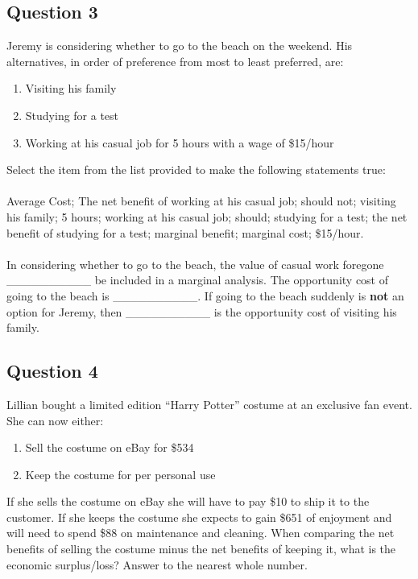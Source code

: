 \subsection{Question 3}
Jeremy is considering whether to go to the beach on the weekend. His alternatives, in order of preference from most to least preferred, are:
\begin{enumerate}
	\item Visiting his family
	\item Studying for a test
	\item Working at his casual job for 5 hours with a wage of \$15/hour
\end{enumerate}
Select the item from the list provided to make the following statements true:\\\\
Average Cost; The net benefit of working at his casual job; should not; visiting his family; 5 hours; working at his casual job; should; studying for a test; the net benefit of studying for a test; marginal benefit; marginal cost; \$15/hour.\\\\
In considering whether to go to the beach, the value of casual work foregone \_\_\_\_\_\_\_\_\_\_ be included in a marginal analysis. The opportunity cost of going to the beach is \_\_\_\_\_\_\_\_\_\_. If going to the beach suddenly is \textbf{not} an option for Jeremy, then \_\_\_\_\_\_\_\_\_\_ is the opportunity cost of visiting his family.

\subsection{Question 4}
Lillian bought a limited edition ``Harry Potter'' costume at an exclusive fan event. She can now either:
\begin{enumerate}
	\item Sell the costume on eBay for \$534
	\item Keep the costume for per personal use
\end{enumerate}
If she sells the costume on eBay she will have to pay \$10 to ship it to the customer. If she keeps the costume she expects to gain \$651 of enjoyment and will need to spend \$88 on maintenance and cleaning. When comparing the net benefits of selling the costume minus the net benefits of keeping it, what is the economic surplus/loss? Answer to the nearest whole number.

